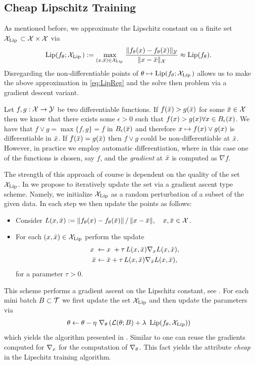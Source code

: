 \subsection{Cheap Lipschitz Training}
As mentioned before, we approximate the Lipschitz constant on a finite set $\mathcal{X}_{\operatorname{Lip}{}}\subset\mathcal{X}\times\mathcal{X}$ via
%
\begin{align*}
\operatorname*{Lip}(f_\theta; \mathcal{X}_{\operatorname{Lip}{}}) := 
\max_{(x,\bar{x})\in\mathcal{X}_{\operatorname{Lip}{}}} \frac{\|f_\theta(x)-f_\theta(\bar{x})\|_{\mathcal{\mathcal{Y}}}}{\|x-\bar{x}\|_{\mathcal{X}}}
\approx
\operatorname*{Lip}(f_\theta).
\end{align*}
%
%
Disregarding the non-differentiable points of $\theta\mapsto \operatorname*{Lip}(f_\theta; \mathcal{X}_{\operatorname{Lip}{}})$ allows us to make the above approximation in \cref{eq:LipReg} and the solve then problem via a gradient descent variant.
%
\begin{remark}{}{}
Let $f,g:\mathcal{X}\to\mathcal{\mathcal{Y}}$ be two differentiable functions. If $f(\bar{x})>g(\bar{x})$ for some $\bar{x}\in\mathcal{X}$ then we know that there exists some $\epsilon>0$ such that $f(x)>g(x)\forall x\in B_\epsilon(\bar{x})$. We have that $f\vee g = \max\{f,g\} = f$ in $B_\epsilon(\bar{x})$ and therefore $x\mapsto f(x)\vee g(x)$ is differentiable in $\bar{x}$. If $f(\bar{x})=g(\bar{x})$ then $f\vee g$ could be non-differentiable at $\bar{x}$. However, in practice we employ automatic differentiation, where in this case one of the functions is chosen, say $f$, and the \emph{gradient} at $\bar{x}$ is computed as $\nabla f$. 
\end{remark}
%
%
\noindent%
The strength of this approach of course is dependent on the quality of the set $\mathcal{X}_{\operatorname{Lip}}$. In \cite{bungert2021clip} we propose to iteratively update the set via a gradient ascent type scheme. Namely, we initialize $\mathcal{X}_{\operatorname{Lip}}$ as a random perturbation of a subset of the given data. In each step we then update the points as follows:
\begin{itemize}
\item Consider $L(x,\bar{x}) := {\|f_\theta(x)-f_\theta(\bar{x})\|}\,/\,{\|x-\bar{x}\|},\quad x,\bar{x}\in\mathcal{X}$.
\item For each $(x,\bar{x})\in\mathcal{X}_{\operatorname{Lip}}$ perform the update 
%
\begin{align*}
x\phantom{'} &\gets x\phantom{'} + \tau\,L(x,\bar{x}) \nabla_{x} L(x,\bar{x}),\\
\bar{x} &\gets \bar{x} + \tau\,L(x,\bar{x}) \nabla_{\bar{x}} L(x,\bar{x}),
\end{align*}
%
for a parameter $\tau>0$.
\end{itemize}
%
This scheme performs a gradient ascent on the Lipschitz constant, see \cite[Alg. 1]{bungert2021clip}. For each mini batch $B\subset\mathcal{T}$ we first update the set $\mathcal{X}_{\operatorname{Lip}}$ and then update the parameters via
%
\begin{align*}
\theta \gets \theta - \eta\ \nabla_\theta\left(\mathcal{L}(\theta; B) + 
\lambda~\operatorname*{Lip}(f_\theta,\mathcal{X}_{\operatorname{Lip}})\right)
\end{align*}
%
which yields the algorithm presented in \cite[Alg. 2]{bungert2021clip}. Similar to \cite{shafahi2019adversarial} one can reuse the gradients computed for $\nabla_x$ for the computation of $\nabla_\theta$. This fact yields the attribute \emph{cheap} in the Lipschitz training algorithm.
%
